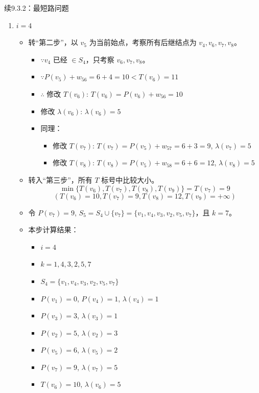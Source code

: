 \begin{exbox}{续9.3.2：最短路问题}{}
\begin{enumerate}[label=(\arabic*)]
			\item \( i = 4 \)
			\begin{itemize}
				\item 转“第二步”，以 \( v_5 \) 为当前始点，考察所有后继结点为 \( v_4, v_6, v_7, v_8 \)。
				\begin{itemize}
					\item \(\because v_4 \) 已经 \( \in S_4 \)，只考察 \( v_6, v_7, v_8 \)。
					\item \(\because P(v_5) + w_{56} = 6 + 4 = 10 < T(v_6) = 11 \)
					\item \(\therefore\) 修改 \( T(v_6) \): \( T(v_6) = P(v_6) + w_{56} = 10 \)
					\item 修改 \( \lambda(v_6) \): \( \lambda(v_6) = 5 \)
					\item 同理：
					\begin{itemize}
						\item 修改 \( T(v_7) \): \( T(v_7) = P(v_5) + w_{57} = 6 + 3 = 9 \), \( \lambda(v_7) = 5 \)
						\item 修改 \( T(v_8) \): \( T(v_8) = P(v_5) + w_{58} = 6 + 6 = 12 \), \( \lambda(v_8) = 5 \)
					\end{itemize}
				\end{itemize}
				\item 转入“第三步”，所有 \( T \) 标号中比较大小。
				\[
				\min \{T(v_6), T(v_7), T(v_8), T(v_9)\} = T(v_7) = 9
				\]
				\[
				(T(v_6) = 10, T(v_7) = 9, T(v_8) = 12, T(v_9) = +\infty)
				\]
				\item 令 \( P(v_7) = 9 \), \( S_5 = S_4 \cup \{v_7\} = \{v_1, v_4, v_3, v_2, v_5, v_7\} \)，且 \( k = 7 \)。
				\item 本步计算结果：
				\begin{itemize}
					\item \( i = 4 \)
					\item \( k = 1, 4, 3, 2, 5, 7 \)
					\item \( S_4 = \{ v_1, v_4, v_3, v_2, v_5, v_7 \} \)
					\item \( P(v_1) = 0 \), \( P(v_4) = 1 \), \( \lambda(v_4) = 1 \)
					\item \( P(v_3) = 3 \), \( \lambda(v_3) = 1 \)
					\item \( P(v_2) = 5 \), \( \lambda(v_2) = 3 \)
					\item \( P(v_5) = 6 \), \( \lambda(v_5) = 2 \)
					\item \( P(v_7) = 9 \), \( \lambda(v_7) = 5 \)
					\item \( T(v_6) = 10 \), \( \lambda(v_6) = 5 \)

\end{itemize}
\end{itemize}
\end{enumerate}
\end{exbox}
